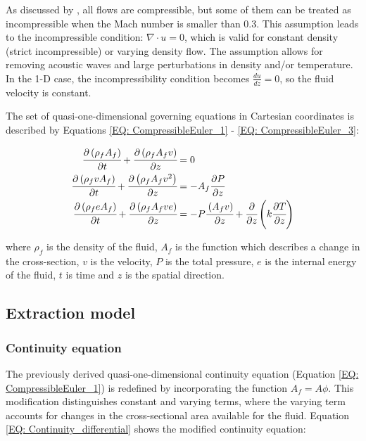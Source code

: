 \documentclass[a4paper,fleqn]{cas-dc}
\begin{document}
As discussed by \citet{Anderson2023}, all flows are compressible, but some of them can be treated as incompressible when the Mach number is smaller than 0.3. This assumption leads to the incompressible condition: $\nabla \cdot u =0$, which is valid for constant density (strict incompressible) or varying density flow. The assumption allows for removing acoustic waves and large perturbations in density and/or temperature. In the 1-D case, the incompressibility condition becomes $\frac{du}{dz} = 0$, so the fluid velocity is constant.

The set of quasi-one-dimensional governing equations in Cartesian coordinates is described by Equations \ref{EQ: CompressibleEuler_1} - \ref{EQ: CompressibleEuler_3}:

{\footnotesize
	\begin{align}
		\label{EQ: CompressibleEuler_1}
		\cfrac{\partial \left( \rho_f A_f \right) }{\partial t} + \cfrac{\partial \left( \rho_f A_f v \right)}{\partial z} &= 0 \\
		\cfrac{\partial \left( \rho_f v A_f \right) }{\partial t} + \cfrac{\partial \left( \rho_f A_f v^2 \right)}{\partial z} &= -A_f \cfrac{\partial P}{\partial z} \label{EQ: CompressibleEuler_2} \\
		\cfrac{\partial \left( \rho_f e A_f \right) }{\partial t} + \cfrac{\partial \left( \rho_f A_f v e\right)}{\partial z} &= -P\cfrac{\left( A_f v \right)}{\partial z} + \cfrac{\partial}{\partial z} \left( k \cfrac{\partial T}{\partial z} \right)   
		\label{EQ: CompressibleEuler_3}
	\end{align}  
}

where $\rho_f$ is the density of the fluid, $A_f$ is the function which describes a change in the cross-section, $v$ is the velocity, $P$ is the total pressure, $e$ is the internal energy of the fluid, $t$ is time and $z$ is the spatial direction.

\subsection{Extraction model} \label{CH: Extraction_model}
\subsubsection{Continuity equation} \label{CH: Continuity}

The previously derived quasi-one-dimensional continuity equation (Equation \ref{EQ: CompressibleEuler_1}) is redefined by incorporating the function $A_f = A\phi$. This modification distinguishes constant and varying terms, where the varying term accounts for changes in the cross-sectional area available for the fluid. Equation \ref{EQ: Continuity_differential} shows the modified continuity equation:
\end{document}
